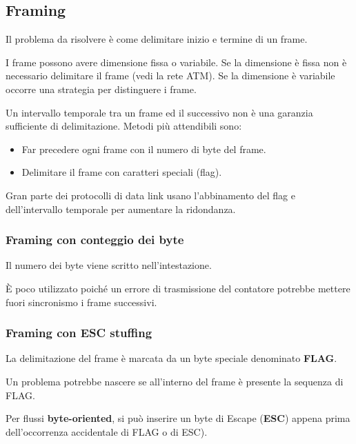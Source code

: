     \subsection{Framing}
        Il problema da risolvere è come delimitare inizio e termine di un frame.
    
        I frame possono avere dimensione fissa o variabile. Se la dimensione è fissa non è necessario delimitare il frame (vedi la rete ATM). Se la dimensione è variabile occorre una strategia per distinguere i frame.
    
        Un intervallo temporale tra un frame ed il successivo non è una garanzia sufficiente di delimitazione. Metodi più attendibili sono:
        \begin{itemize}
            \item Far precedere ogni frame con il numero di byte del frame.
            \item Delimitare il frame con caratteri speciali (flag).
        \end{itemize}

        Gran parte dei protocolli di data link usano l'abbinamento del flag e dell'intervallo temporale per aumentare la ridondanza.

        \subsubsection{Framing con conteggio dei byte}
            Il numero dei byte viene scritto nell'intestazione.

            È poco utilizzato poiché un errore di trasmissione del contatore potrebbe mettere fuori sincronismo i frame successivi.

            

        \subsubsection{Framing con ESC stuffing}
            La delimitazione del frame è marcata da un byte speciale denominato \textbf{FLAG}.

            Un problema potrebbe nascere se all'interno del frame è presente la sequenza di FLAG.

            Per flussi \textbf{byte-oriented}, si può inserire un byte di Escape (\textbf{ESC}) appena prima dell'occorrenza accidentale di FLAG o di ESC).

            


